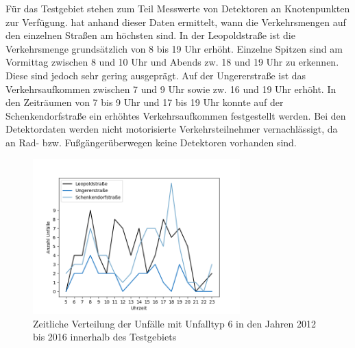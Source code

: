 Für das Testgebiet stehen zum Teil Messwerte von Detektoren an Knotenpunkten zur Verfügung. \Textcite[S. 10-16]{Bruhn.2018} hat anhand dieser Daten ermittelt, wann die Verkehrsmengen auf den einzelnen Straßen am höchsten sind. In der Leopoldstraße ist die Verkehrsmenge grundsätzlich von 8 bis 19 Uhr erhöht. Einzelne Spitzen sind am Vormittag zwischen 8 und 10 Uhr und Abends zw. 18 und 19 Uhr zu erkennen. Diese sind jedoch sehr gering ausgeprägt. Auf der Ungererstraße ist das Verkehrsaufkommen zwischen 7 und 9 Uhr sowie zw. 16 und 19 Uhr erhöht. In den Zeiträumen von 7 bis 9 Uhr und 17 bis 19 Uhr konnte auf der Schenkendorfstraße ein erhöhtes Verkehrsaufkommen festgestellt werden. Bei den Detektordaten werden nicht motorisierte Verkehrsteilnehmer vernachlässigt, da an Rad- bzw. Fußgängerüberwegen keine Detektoren vorhanden sind.

\begin{savenotes}
	\begin{figure}[H]
		\centering
		\includegraphics[width=8cm,height=6cm]{figures/Typ6}
		\caption[Zeitliche Verteilung der Unfälle mit Unfalltyp 6 in den Jahren 2012 bis 2016 innerhalb des Testgebiets]{Zeitliche Verteilung der Unfälle mit Unfalltyp 6 in den Jahren 2012 bis 2016 innerhalb des Testgebiets}\label{fig:Unfalltyp6_Uhrzeit}
	\end{figure}
\end{savenotes}

